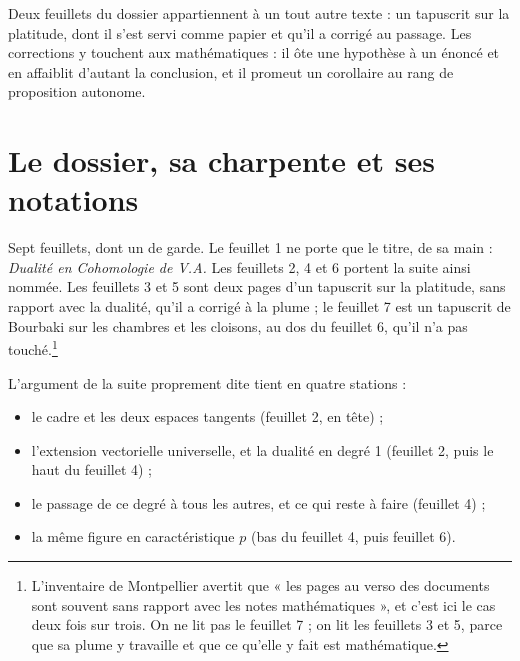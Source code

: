 \documentclass[11pt,a4paper]{article}
\begin{document}
\begin{resume}
Deux feuillets du dossier appartiennent à un tout autre texte : un tapuscrit
sur la platitude, dont il s'est servi comme papier et qu'il a corrigé au
passage. Les corrections y touchent aux mathématiques : il ôte
une hypothèse à un énoncé et en affaiblit d'autant la conclusion, et il promeut
un corollaire au rang de proposition autonome.

\end{resume}

\section*{Le dossier, sa charpente et ses notations}

Sept feuillets, dont un de garde. Le feuillet 1 ne porte que le titre, de sa
main : \emph{Dualité en Cohomologie de V.A.} Les feuillets 2, 4 et 6 portent la
suite ainsi nommée. Les feuillets 3 et 5 sont deux pages d'un tapuscrit sur la
platitude, sans rapport avec la dualité, qu'il a corrigé à la plume ; le
feuillet 7 est un tapuscrit de Bourbaki sur les chambres et les cloisons, au
dos du feuillet 6, qu'il n'a pas touché.\footnote{L'inventaire de Montpellier
avertit que « les pages au verso des documents sont souvent sans rapport avec
les notes mathématiques », et c'est ici le cas deux fois sur trois. On ne lit
pas le feuillet 7 ; on lit les feuillets 3 et 5, parce que sa plume y travaille
et que ce qu'elle y fait est mathématique.}

L'argument de la suite proprement dite tient en quatre stations :

\begin{itemize}
\item le cadre et les deux espaces tangents (feuillet 2, en tête) ;
\item l'extension vectorielle universelle, et la dualité en degré 1
  (feuillet 2, puis le haut du feuillet 4) ;
\item le passage de ce degré à tous les autres, et ce qui reste à faire
  (feuillet 4) ;
\item la même figure en caractéristique $p$ (bas du feuillet 4, puis
  feuillet 6).
\end{itemize}
\end{document}
